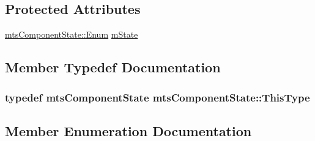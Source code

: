 \subsection*{Protected Attributes}
\begin{DoxyCompactItemize}
\item 
\hyperlink{classmts_component_state_a1158e4d2d79fff671354909e87f58928}{mts\+Component\+State\+::\+Enum} \hyperlink{classmts_component_state_a9642f5cda1abadbfde645b6e687da583}{m\+State}
\end{DoxyCompactItemize}


\subsection{Member Typedef Documentation}
\hypertarget{classmts_component_state_a668efaf1bf3c84a5448587f04d7312b5}{}
\subsubsection[{This\+Type}]{\setlength{\rightskip}{0pt plus 5cm}typedef {\bf mts\+Component\+State} {\bf mts\+Component\+State\+::\+This\+Type}}\label{classmts_component_state_a668efaf1bf3c84a5448587f04d7312b5}


\subsection{Member Enumeration Documentation}
\hypertarget{classmts_component_state_a1158e4d2d79fff671354909e87f58928}{}

